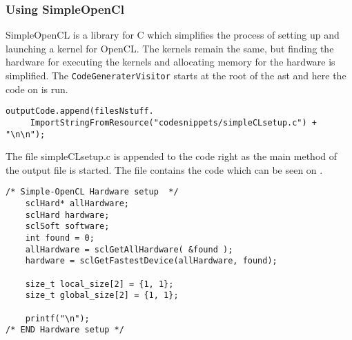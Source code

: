 \subsubsection*{Using SimpleOpenCl}
SimpleOpenCL is a library for C which simplifies the process of setting up and launching a kernel for OpenCL.
The kernels remain the same, but finding the hardware for executing the kernels and allocating memory for the hardware is simplified.
The \texttt{CodeGeneraterVisitor} starts at the root of the \acrshort{ast} and here the code on  is run.

\begin{lstlisting}[caption=Call to setup SimpleOpenCL in the compiler,numbers=none,frame=tlrb,label={lst:OpenCLSetup}]
outputCode.append(filesNstuff.
	 ImportStringFromResource("codesnippets/simpleCLsetup.c") + "\n\n");
\end{lstlisting}
The file simpleCLsetup.c is appended to the code right as the main method of the output file is started.
The file contains the code which can be seen on .

\begin{lstlisting}[caption=SimpleOpenCL setup in the compiler,numbers=none,frame=tlrb,label={lst:OpenCLSetup2}]
/* Simple-OpenCL Hardware setup  */
	sclHard* allHardware;
	sclHard hardware;
	sclSoft software;
	int found = 0;
	allHardware = sclGetAllHardware( &found );
	hardware = sclGetFastestDevice(allHardware, found);

    size_t local_size[2] = {1, 1};
    size_t global_size[2] = {1, 1}; 

    printf("\n");
/* END Hardware setup */
\end{lstlisting}

